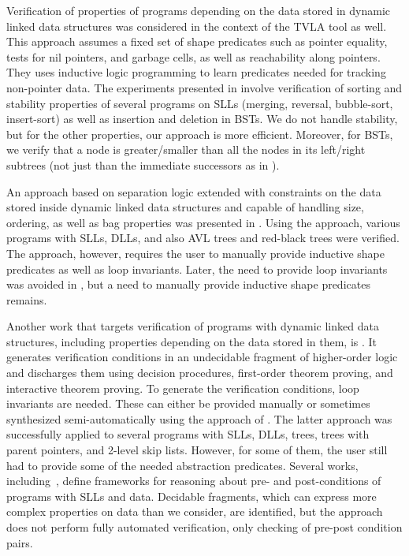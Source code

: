 Verification of properties of programs depending on the data stored in dynamic
linked data structures was considered in the context of the TVLA tool
\cite{Loginov:AbstrRefViaInductLearning:05} as well. This approach assumes a fixed set of shape
predicates such as pointer equality, tests for nil pointers, and garbage cells, as well as
reachability along pointers. They uses inductive logic programming to learn predicates needed for
tracking non-pointer data. The experiments presented in
\cite{Loginov:AbstrRefViaInductLearning:05} involve verification of sorting and
stability properties of several programs on SLLs (merging, reversal,
bubble-sort, insert-sort) as well as insertion and deletion in BSTs. We do not
handle stability, but for the other properties, our approach is more efficient. 
Moreover, for BSTs, we verify that a node is greater/smaller than all the nodes
in its left/right subtrees (not just than the immediate successors as in
\cite{Loginov:AbstrRefViaInductLearning:05}).

An approach based on separation logic extended with constraints on the data
stored inside dynamic linked data structures and capable of handling size,
ordering, as well as bag properties was presented in \cite{rival11}. Using the
approach, various programs with SLLs, DLLs, and also AVL trees and red-black
trees were verified. The approach, however, requires the user to manually
provide inductive shape predicates as well as loop invariants.  Later, the need
to provide loop invariants was avoided in \cite{sleek13}, but a need to manually
provide inductive shape predicates remains.

Another work that targets verification of programs with dynamic linked data
structures, including properties depending on the data stored in them, is
\cite{Hongseok:SL}. It generates verification conditions in an undecidable
fragment of higher-order logic and discharges them using decision procedures,
first-order theorem proving, and interactive theorem proving. To generate the
verification conditions, loop invariants are needed. These can either be
provided manually or sometimes synthesized semi-automatically using the approach
of \cite{SagivRW02}. The latter approach was successfully applied to several
programs with SLLs, DLLs, trees, trees with parent pointers, and 2-level skip
lists. However, for some of them, the user still had to provide some of the
needed abstraction predicates.
Several works, including~\cite{dragoi:atva12}, define frameworks for reasoning
about pre- and post-conditions of programs with SLLs and data. Decidable
fragments, which can express more complex properties on data than we consider,
are identified, but the approach does not perform fully automated verification,
only checking of pre-post condition pairs.


